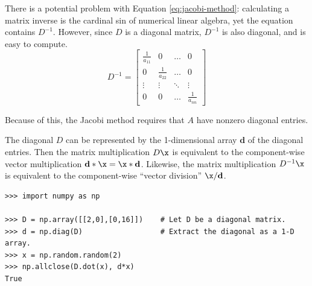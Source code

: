 There is a potential problem with Equation \ref{eq:jacobi-method}: calculating a matrix inverse is the cardinal sin of numerical linear algebra, yet the equation contains $D^{-1}$.
However, since $D$ is a diagonal matrix, $D^{-1}$ is also diagonal, and is easy to compute.
\[
D^{-1} =
\left[\begin{array}{cccc}
    \frac{1}{a_{11}} & 0                & \ldots & 0      \\
    0                & \frac{1}{a_{22}} & \ldots & 0      \\
    \vdots           & \vdots           & \ddots & \vdots \\
    0                & 0                & \ldots & \frac{1}{a_{nn}}
\end{array}\right]
\]

Because of this, the Jacobi method requires that $A$ have nonzero diagonal entries.

The diagonal $D$ can be represented by the 1-dimensional array $\mathbf{d}$ of the diagonal entries. %
Then the matrix multiplication $D\x$ is equivalent to the component-wise vector multiplication $\mathbf{d}*\x = \x*\mathbf{d}$.
Likewise, the matrix multiplication $D^{-1}\x$ is equivalent to the component-wise ``vector division'' $\x/\mathbf{d}$.

\begin{lstlisting}
>>> import numpy as np

>>> D = np.array([[2,0],[0,16]])    # Let D be a diagonal matrix.
>>> d = np.diag(D)                  # Extract the diagonal as a 1-D array.
>>> x = np.random.random(2)
>>> np.allclose(D.dot(x), d*x)
True
\end{lstlisting}

